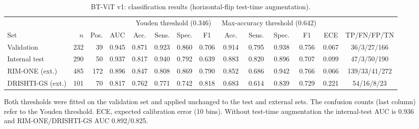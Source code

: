 \documentclass[10pt]{article}
\begin{document}
\begin{table}[h]
\centering
\begin{threeparttable}
\caption{BT-ViT v1: classification results (horizontal-flip test-time augmentation).}
\label{tab:v1results}
\scriptsize
\setlength{\tabcolsep}{3pt}
\begin{tabular}{@{}lrrc cccc cccc cc@{}}
\toprule
 & & & & \multicolumn{4}{c}{Youden threshold (0.346)} & \multicolumn{4}{c}{Max-accuracy threshold (0.642)} & & \\
\cmidrule(lr){5-8} \cmidrule(lr){9-12}
Set & $n$ & Pos. & AUC & Acc. & Sens. & Spec. & F1 & Acc. & Sens. & Spec. & F1 & ECE & TP/FN/FP/TN \\
\midrule
Validation & 232 & 39 & 0.945 & 0.871 & 0.923 & 0.860 & 0.706 & 0.914 & 0.795 & 0.938 & 0.756 & 0.067 & 36/3/27/166 \\
Internal test & 290 & 50 & 0.937 & 0.817 & 0.940 & 0.792 & 0.639 & 0.883 & 0.820 & 0.896 & 0.707 & 0.099 & 47/3/50/190 \\
RIM-ONE (ext.) & 485 & 172 & 0.896 & 0.847 & 0.808 & 0.869 & 0.790 & 0.852 & 0.686 & 0.942 & 0.766 & 0.066 & 139/33/41/272 \\
DRISHTI-GS (ext.) & 101 & 70 & 0.817 & 0.762 & 0.771 & 0.742 & 0.818 & 0.683 & 0.614 & 0.839 & 0.729 & 0.221 & 54/16/8/23 \\
\bottomrule
\end{tabular}
\begin{tablenotes}\footnotesize
\item[] Both thresholds were fitted on the validation set and applied unchanged to the test and external
sets. The confusion counts (last column) refer to the Youden threshold. ECE, expected calibration error
(10 bins). Without test-time augmentation the internal-test AUC is 0.936 and RIM-ONE/DRISHTI-GS AUC
0.892/0.825.
\end{tablenotes}
\end{threeparttable}
\end{table}
\end{document}
